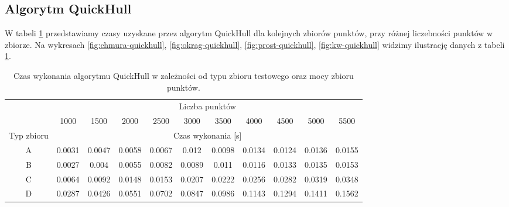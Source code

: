 \documentclass[11pt]{article}
\theoremstyle{remark} \newtheorem{definition}{def.}
\theoremstyle{definition} \newtheorem{twierdzenie}{tw.}
\begin{document}
\subsection{Algorytm QuickHull}

W tabeli \ref{tab:quickhull} przedstawiamy czasy uzyskane przez algorytm QuickHull dla kolejnych zbiorów punktów, przy różnej liczebności punktów w zbiorze. Na wykresach \ref{fig:chmura-quickhull}, 
\ref{fig:okrag-quickhull}, \ref{fig:prost-quickhull}, \ref{fig:kw-quickhull} widzimy ilustrację danych z tabeli \ref{tab:quickhull}.

\begin{table}[]
\centering
\caption{Czas wykonania algorytmu QuickHull w zależności od typu zbioru testowego oraz mocy zbioru punktów.}
\label{tab:quickhull}
\begin{tabular}{c|c|c|c|c|c|c|c|c|c|c|}
\cline{2-11}
\multicolumn{1}{l|}{} & \multicolumn{10}{c|}{Liczba punktów} \\ \cline{2-11} 
\multicolumn{1}{l|}{} & 1000 & 1500 & 2000 & 2500 & 3000 & 3500 & 4000 & 4500 & 5000 & 5500 \\ \hline
\multicolumn{1}{|c|}{Typ zbioru} & \multicolumn{10}{c|}{Czas wykonania {[}s{]}} \\ \hline
\multicolumn{1}{|c|}{A} & 0.0031 & 0.0047 & 0.0058 & 0.0067 & 0.012 & 0.0098 & 0.0134 & 0.0124 & 0.0136 & 0.0155 \\ \hline
\multicolumn{1}{|c|}{B} & 0.0027 & 0.004 & 0.0055 & 0.0082 & 0.0089 & 0.011 & 0.0116 & 0.0133 & 0.0135 & 0.0153 \\ \hline
\multicolumn{1}{|c|}{C} & 0.0064 & 0.0092 & 0.0148 & 0.0153 & 0.0207 & 0.0222 & 0.0256 & 0.0282 & 0.0319 & 0.0348 \\ \hline
\multicolumn{1}{|c|}{D} & 0.0287 & 0.0426 & 0.0551 & 0.0702 & 0.0847 & 0.0986 & 0.1143 & 0.1294 & 0.1411 & 0.1562 \\ \hline
\end{tabular}
\end{table}
\end{document}
